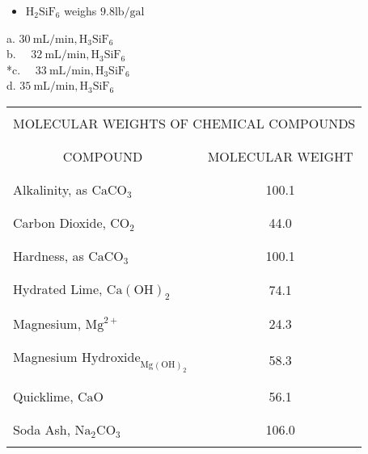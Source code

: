 \begin{enumerate}
\begin{itemize}
\item $\mathrm{H}_{2} \mathrm{SiF}_{6}$ weighs $9.8 \mathrm{lb} / \mathrm{gal}$\\
\end{itemize}
a. $30 \mathrm{~mL} / \mathrm{min}, \mathrm{H}_{3} \mathrm{SiF}_{6}$\\
b. $\quad 32 \mathrm{~mL} / \mathrm{min}, \mathrm{H}_{3} \mathrm{SiF}_{6}$\\
*c. $\quad 33 \mathrm{~mL} / \mathrm{min}, \mathrm{H}_{3} \mathrm{SiF}_{6}$\\
d. $35 \mathrm{~mL} / \mathrm{min}, \mathrm{H}_{3} \mathrm{SiF}_{6}$\\
\begin{center}
\begin{tabular}{|l|c|}
\hline\\
\multicolumn{2}{|c|}{MOLECULAR WEIGHTS OF CHEMICAL COMPOUNDS} \\\\
\hline\\
\multicolumn{1}{|c|}{COMPOUND} & MOLECULAR WEIGHT \\\\
\hline\\
Alkalinity, as $\mathrm{CaCO}_{3}$ & 100.1 \\\\
\hline\\
Carbon Dioxide, $\mathrm{CO}_{2}$ & 44.0 \\\\
\hline\\
Hardness, as $\mathrm{CaCO}_{3}$ & 100.1 \\\\
\hline\\
Hydrated Lime, $\mathrm{Ca}(\mathrm{OH})_{2}$ & 74.1 \\\\
\hline\\
Magnesium, $\mathrm{Mg}^{2+}$ & 24.3 \\\\
\hline\\
Magnesium $\mathrm{Hydroxide}_{\mathrm{Mg}(\mathrm{OH})_{2}}$ & 58.3 \\\\
\hline\\
Quicklime, $\mathrm{CaO}$ & 56.1 \\\\
\hline\\
Soda Ash, $\mathrm{Na}_{2} \mathrm{CO}_{3}$ & 106.0 \\\\

\end{tabular}
\end{center}
\end{enumerate}
